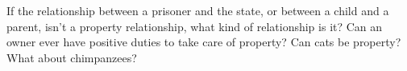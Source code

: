 If the relationship between a prisoner and the state, or between a child and a
parent, isn't a property relationship, what kind of relationship is it?  Can an
owner ever have positive duties to take care of property?  Can cats be
property?  What about chimpanzees?

